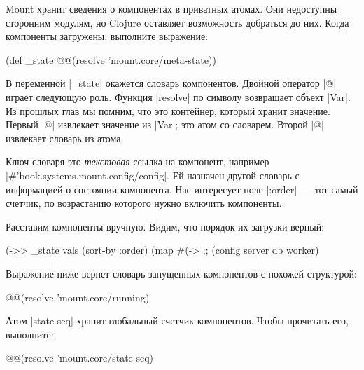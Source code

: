 Mount хранит сведения о компонентах в приватных атомах. Они недоступны
сторонним модулям, но Clojure оставляет возможность добраться до них. Когда
компоненты загружены, выполните выражение:

\begin{english}
  \begin{clojure}
(def _state @@(resolve 'mount.core/meta-state))
  \end{clojure}
\end{english}

В переменной \spverb|_state| окажется словарь компонентов. Двойной оператор
\spverb|@| играет следующую роль. Функция \spverb|resolve| по символу возвращает
объект \spverb|Var|. Из прошлых глав мы помним, что это контейнер, который
хранит значение. Первый \spverb|@| извлекает значение из \spverb|Var|; это атом
со словарем. Второй \spverb|@| извлекает словарь из атома.

Ключ словаря это \emph{текстовая} ссылка на компонент, например
\spverb|#'book.systems.mount.config/config|. Ей назначен другой словарь с
информацией о состоянии компонента. Нас интересует поле \spverb|:order|~--- тот
самый счетчик, по возрастанию которого нужно включить компоненты.

Расставим компоненты вручную. Видим, что порядок их загрузки верный:

\begin{english}
  \begin{clojure}
(->> _state
     vals
     (sort-by :order)
     (map #(-> %
;; (config server db worker)
  \end{clojure}
\end{english}

Выражение ниже вернет словарь запущенных компонентов с похожей структурой:

\begin{english}
  \begin{clojure}
@@(resolve 'mount.core/running)
  \end{clojure}
\end{english}

Атом \spverb|state-seq| хранит глобальный счетчик компонентов. Чтобы прочитать
его, выполните:

\begin{english}
  \begin{clojure}
@@(resolve 'mount.core/state-seq)
  \end{clojure}
\end{english}

